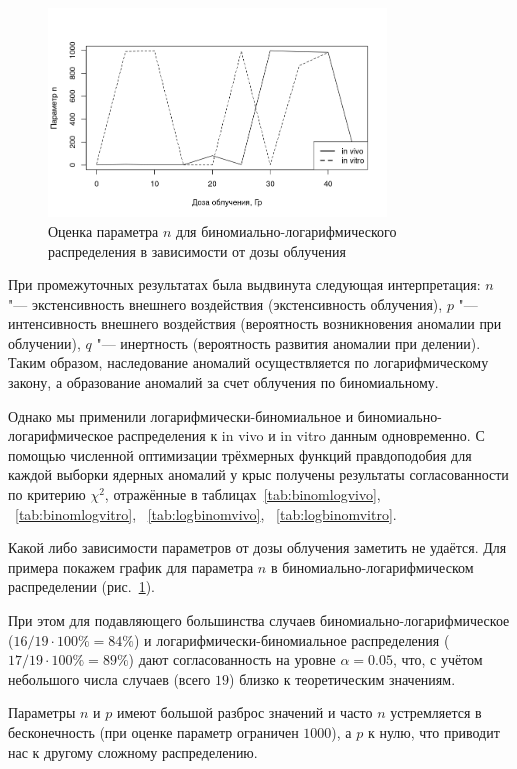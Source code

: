 \documentclass[12pt, specialist, subf, substylefile = spbu.rtx]{disser}
\begin{document}
	\begin{figure}[!ht]
		\centering
		\includegraphics[width = 0.8\textwidth]{logbinomn}
		\caption{Оценка параметра $n$ для биномиально-логарифмического распределения в зависимости от дозы облучения}
		\label{img:logbinomn}
	\end{figure}
	
	При промежуточных результатах была выдвинута следующая интерпретация: $ n $ "--- экстенсивность внешнего воздействия (экстенсивность облучения), $ p $ "--- интенсивность внешнего воздействия (вероятность возникновения аномалии при облучении), $ q $ "--- инертность (вероятность развития аномалии при делении). Таким образом, наследование аномалий осуществляется по логарифмическому закону, а образование аномалий за счет облучения  по биномиальному.
	
	Однако мы применили логарифмически-биномиальное и биномиально-логарифмическое распределения к in vivo и in vitro данным одновременно. С помощью численной оптимизации трёхмерных функций правдоподобия для каждой выборки ядерных аномалий у крыс получены результаты согласованности по критерию $ \chi ^2 $, отражённые в таблицах~\ref{tab:binomlogvivo}, ~\ref{tab:binomlogvitro}, ~\ref{tab:logbinomvivo}, ~\ref{tab:logbinomvitro}.
	
	Какой либо зависимости параметров от дозы облучения заметить не удаётся. Для примера покажем график для параметра $n$ в биномиально-логарифмическом распределении (рис.~\ref{img:logbinomn}).
	
	При этом для подавляющего большинства случаев биномиально-логарифмическое ($16 / 19 \cdot 100\% = 84\%$) и логарифмически-биномиальное распределения ($17 / 19 \cdot 100\% = 89\%$) дают согласованность на уровне $\alpha = 0.05$, что, с учётом небольшого числа случаев (всего $19$) близко к теоретическим значениям.
	
	Параметры $n$ и $p$ имеют большой разброс значений и часто $n$ устремляется в бесконечность (при оценке параметр ограничен $1000$), а $p$ к нулю, что приводит нас к другому сложному распределению.
	
\end{document}
